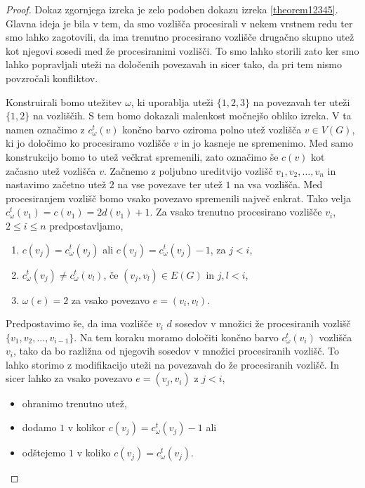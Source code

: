 \documentclass[12pt,a4paper,twoside]{article}
\theoremstyle{definition} %
\theoremstyle{plain} %
\numberwithin{equation}{section}  %
\begin{document}
\begin{proof}
Dokaz zgornjega izreka je zelo podoben dokazu izreka \ref{theorem12345}. Glavna ideja je bila v tem, da smo vozlišča procesirali v nekem vrstnem redu ter smo lahko zagotovili, da ima trenutno procesirano vozlišče drugačno skupno utež kot njegovi sosedi med že procesiranimi vozlišči. To smo lahko storili zato ker smo lahko popravljali uteži na določenih povezavah in sicer tako, da pri tem nismo povzročali konfliktov.

Konstruirali bomo utežitev $\omega$, ki uporablja uteži $\{1,2,3\}$ na povezavah ter uteži $\{1,2\}$ na vozliščih. S tem bomo dokazali malenkost močnejšo obliko izreka. V ta namen označimo z $c_{\omega}^t(v)$ končno barvo oziroma polno utež vozlišča $v \in V(G)$, ki jo določimo ko procesiramo vozlišče $v$ in jo kasneje ne spremenimo. Med samo konstrukcijo bomo to utež večkrat spremenili, zato označimo še $c(v)$ kot začasno utež vozlišča $v$. Začnemo z poljubno ureditvijo vozlišč $v_1, v_2, \ldots, v_n$ in nastavimo začetno utež $2$ na vse povezave ter utež $1$ na vsa vozlišča. Med procesiranjem vozlišč bomo vsako povezavo spremenili največ enkrat. Tako velja $c_{\omega}^t(v_1) = c(v_1) = 2d(v_1) + 1$. Za vsako trenutno procesirano vozlišče $v_i$, $2\le i \le n$ predpostavljamo,
\begin{enumerate}
\item $c(v_j) = c_{\omega}^t(v_j) $ ali $c(v_j) = c_{\omega}^t(v_j)  - 1$, za $j < i$,
\item $c_{\omega}^t(v_j) \neq c_{\omega}^t(v_l)$, če $(v_j,v_l) \in E(G)$ in $j,l < i$,
\item $\omega(e) = 2$ za vsako povezavo $e = (v_i, v_l)$.
\end{enumerate}
Predpostavimo še, da ima vozlišče $v_i$ $d$ sosedov v množici že procesiranih vozlišč $\{v_1, v_2, \ldots, v_{i-1}\}$. Na tem koraku moramo določiti končno barvo $c_{\omega}^t(v_i)$ vozlišča $v_i$, tako da bo razližna od njegovih sosedov v množici procesiranih vozlišč. To lahko storimo z modifikacijo uteži na povezavah do že procesiranih vozlišč. In sicer lahko za vsako povezavo $e = (v_j, v_i)$ z $j < i$,
\begin{itemize}
\item ohranimo trenutno utež,
\item dodamo $1$ v kolikor $c(v_j) = c_{\omega}^t(v_j)   - 1$ ali
\item odštejemo $1$ v koliko $c(v_j) = c_{\omega}^t(v_j) $.
\end{itemize}

\end{proof}
\end{document}

